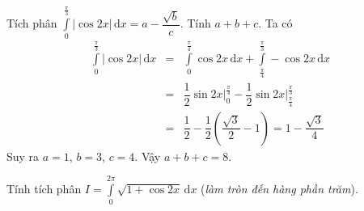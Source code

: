 \begin{ex}%
Tích phân $\displaystyle\int\limits_{0}^{\frac{\pi}{3}}\left|\cos 2x\right|\mathrm{\,d}x=a-\dfrac{\sqrt{b}}{c}$. Tính $a+b+c$.
\loigiai
{Ta có \begin{eqnarray*}
\displaystyle\int\limits_{0}^{\frac{\pi}{3}}\left|\cos 2x\right|\mathrm{\,d}x&=&\displaystyle\int\limits_{0}^{\frac{\pi}{4}}\cos 2x\mathrm{\,d}x+\displaystyle\int\limits_{\frac{\pi}{4}}^{\frac{\pi}{3}}-\cos 2x\mathrm{\,d}x\\
&=&\dfrac{1}{2}\sin 2x\Big|_{0}^{\frac{\pi}{4}}-\dfrac{1}{2}\sin 2x\Big|_{\frac{\pi}{4}}^{\frac{\pi}{3}}\\
&=&\dfrac{1}{2}-\dfrac{1}{2}\left(\dfrac{\sqrt{3}}{2}-1\right)=1-\dfrac{\sqrt{3}}{4}
\end{eqnarray*}
Suy ra $a=1$, $b=3$, $c=4$. Vậy $a+b+c=8$.
}
\end{ex}

\begin{ex}%
Tính tích phân $I=\displaystyle\int\limits _{0}^{2\pi }\sqrt{1+\cos 2x} \mathrm{\,d}x $ (\textit{làm tròn đến hàng phần trăm}).
\end{ex}

